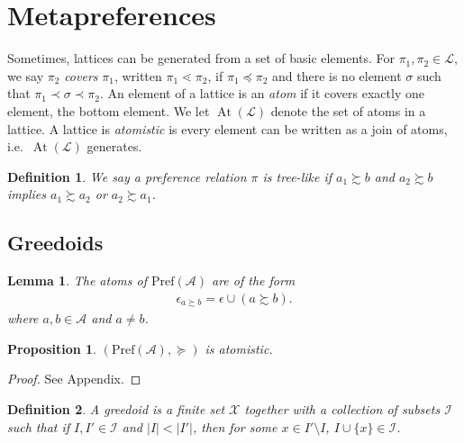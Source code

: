 \documentclass[conference]{ieeeconf}
\newcommand{\A}{\mathcal{A}}
\newcommand{\X}{\mathcal{X}}
\newcommand{\I}{\mathcal{I}}
\newcommand{\Pref}{\mathrm{Pref}}
\renewcommand{\L}{\mathcal{L}}
\newcommand{\prefers}{\succsim}
\DeclareMathOperator{\Atoms}{At}
\newtheorem{lemma}{Lemma}
\newtheorem{proposition}{Proposition}
\newtheorem{definition}{Definition}
\begin{document}
\section{Metapreferences}

Sometimes, lattices can be generated from a set of basic elements. For $\pi_1, \pi_2 \in \L$, we say $\pi_2$ \emph{covers} $\pi_1$, written $\pi_1 \lessdot \pi_2$, if $\pi_1 \preceq \pi_2$ and there is no element $\sigma$ such that $\pi_1 \prec \sigma \prec \pi_2$. An element of a lattice is an \emph{atom} if it covers exactly one element, the bottom element. We let $\Atoms(\L)$ denote the set of atoms in a lattice. A lattice is \emph{atomistic} is every element can be written as a join of atoms, i.e.~$\Atoms(\L)$ generates.


\begin{definition} \label{def:tree-like}
    We say a preference relation $\pi$ is \emph{tree-like} if $a_1 \prefers b$ and $a_2 \prefers b$ implies $a_1 \prefers a_2$ or $a_2 \prefers a_1$.
\end{definition}



\subsection{Greedoids}

\begin{lemma}
    The atoms of $\Pref(\A)$ are of the form
    \begin{align*}
        \epsilon_{a \prefers b} = \epsilon \cup (a \prefers b).
    \end{align*}
    where $a, b \in \A$ and $a \neq b$.
\end{lemma}

\begin{proposition}
    $(\Pref(\A), \succeq)$ is atomistic.
\end{proposition}
\begin{proof}
See Appendix.
\end{proof}

\begin{definition}
    A \emph{greedoid} is a finite set $\X$ together with a collection of subsets $\I$ such that if $I, I' \in \mathcal{I}$ and $|I| < |I'|$, then for some $x \in I' \setminus I$, $I \cup \{x\} \in \I$.
\end{definition}
\end{document}
